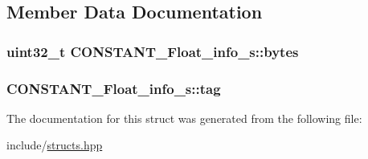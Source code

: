\subsection{Member Data Documentation}
\hypertarget{structCONSTANT__Float__info__s_a8055082e9793f98ddd1feb21029262c6}{
\subsubsection[{bytes}]{\setlength{\rightskip}{0pt plus 5cm}uint32\+\_\+t C\+O\+N\+S\+T\+A\+N\+T\+\_\+\+Float\+\_\+info\+\_\+s\+::bytes}}\label{structCONSTANT__Float__info__s_a8055082e9793f98ddd1feb21029262c6}
\hypertarget{structCONSTANT__Float__info__s_a478b54b29def2238db495fd72bd2c983}{
\subsubsection[{tag}]{ C\+O\+N\+S\+T\+A\+N\+T\+\_\+\+Float\+\_\+info\+\_\+s\+::tag}}\label{structCONSTANT__Float__info__s_a478b54b29def2238db495fd72bd2c983}


The documentation for this struct was generated from the following file\+:\begin{DoxyCompactItemize}
\item 
include/\hyperlink{structs_8hpp}{structs.\+hpp}\end{DoxyCompactItemize}
